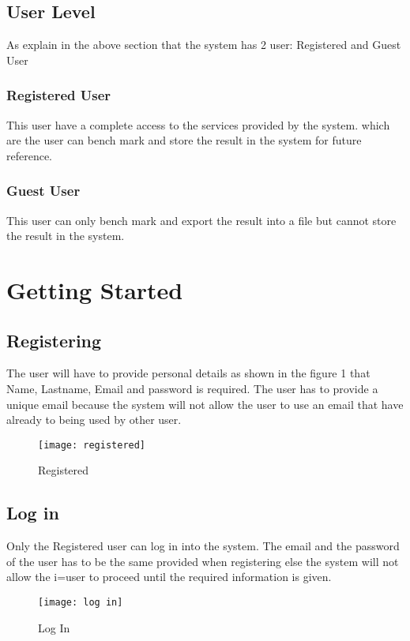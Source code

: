 \documentclass[runningheads,a4paper]{article}
\begin{document}
\subsection{User Level}
As explain in the above section that the system has 2 user: Registered and Guest User
\subsubsection{Registered User}
This user have a complete access to the services provided by the system. which are the user can bench mark and store the result in the system for future reference.
\subsubsection{Guest User}
This user can only bench mark and export the result into a file but cannot store the result in the system.
\section{Getting Started}

\subsection{Registering}
The user will have to provide personal details as shown in the figure 1 that Name, Lastname, Email and password is required. The user has to provide a unique email because the system will not allow the user to use an email that have already to being used by other user.\newline

\begin{figure}[htp]
\centering
\texttt{[image: registered]}
\caption{Registered}
\label{fig:lion}
\end{figure}

\subsection{Log in}
Only the Registered user can log in into the system. The email and the password of the user has to be the same provided when registering else the system will not allow the i=user to proceed until the required information is given.

\begin{figure}[htp]
\centering
\texttt{[image: log in]}
\caption{Log In}
\label{fig:lion}
\end{figure}
\end{document}
